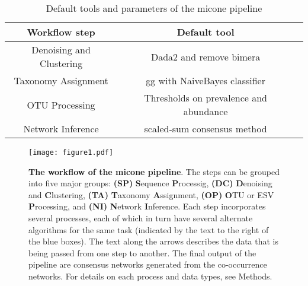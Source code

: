   \begin{table}[h]
    \centering
    \small
    \begin{tabular}{|c|c|c|}
      \hline
      \textbf{Workflow step} & \textbf{Default tool} \\
      \hline
      Denoising and Clustering & Dada2 and remove bimera \\
      Taxonomy Assignment & \ac{gg} with NaiveBayes classifier \\
      OTU Processing & Thresholds on prevalence and abundance \\
      Network Inference & scaled-sum consensus method \\
      \hline
    \end{tabular}
    \caption{Default tools and parameters of the \ac{micone} pipeline}
    \label{tab:default_options}
  \end{table}


  \FloatBarrier
  \newpage

  \begin{figure}[h]
    \centering
    \texttt{[image: figure1.pdf]}
  \end{figure}
  \begin{figure}[ht!]
    \centering
    \caption{
      \textbf{The workflow of the \ac{micone} pipeline}.
      The steps can be grouped into five major groups: \textbf{(SP)} \textbf{S}equence \textbf{P}rocessig, \textbf{(DC)} \textbf{D}enoising and \textbf{C}lustering, \textbf{(TA)} \textbf{T}axonomy \textbf{A}ssignment, \textbf{(OP)} \textbf{O}TU or ESV \textbf{P}rocessing, and \textbf{(NI)} \textbf{N}etwork \textbf{I}nference.
      Each step incorporates several processes, each of which in turn have several alternate algorithms for the same task (indicated by the text to the right of the blue boxes).
      The text along the arrows describes the data that is being passed from one step to another.
      The final output of the pipeline are consensus networks generated from the co-occurrence networks.
      For details on each process and data types, see Methods.
    }
    \label{fig:figure1}
  \end{figure}

  \FloatBarrier
  \newpage

